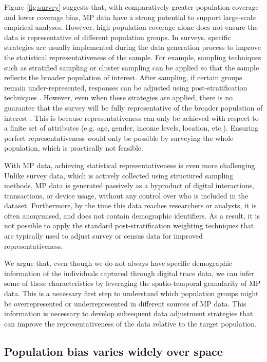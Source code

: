 \documentclass[]{rsos}%
\begin{document}
Figure \ref{fig:survey} suggests that, with comparatively greater
population coverage and lower coverage bias, MP data have a strong
potential to support large-scale empirical analyses. However, high
population coverage alone does not ensure the data is representative of
different population groups. In surveys, specific strategies are usually
implemented during the data generation process to improve the
statistical representativeness of the sample. For example, sampling
techniques such as stratified sampling or cluster sampling can be
applied so that the sample reflects the broader population of interest.
After sampling, if certain groups remain under-represented, responses
can be adjusted using post-stratification techniques \citep{lohr2021}.
However, even when these strategies are applied, there is no guarantee
that the survey will be fully representative of the broader population
of interest \citep{cochran1977sampling}. This is because representativeness
can only be achieved with respect to a finite set of attributes (e.g.
age, gender, income levels, location, etc.). Ensuring perfect
representativeness would only be possible by surveying the whole
population, which is practically not feasible.

With MP data, achieving statistical representativeness is even more
challenging. Unlike survey data, which is actively collected using
structured sampling methods, MP data is generated passively as a
byproduct of digital interactions, transactions, or device usage,
without any control over who is included in the dataset. Furthermore, by
the time this data reaches researchers or analysts, it is often
anonymised, and does not contain demographic identifiers. As a result,
it is not possible to apply the standard post-stratification weighting
techniques that are typically used to adjust survey or census data for
improved representativeness.

We argue that, even though we do not always have specific demographic
information of the individuals captured through digital trace data, we
can infer some of these characteristics by leveraging the
spatio-temporal granularity of MP data. This is a necessary first step
to understand which population groups might be overrepresented or
underrepresented in different sources of MP data. This information is
necessary to develop subsequent data adjustment strategies that can
improve the representativeness of the data relative to the target
population.

\subsection{Population bias varies widely over space}\label{population-bias-varies-widely-over-space}
\end{document}
